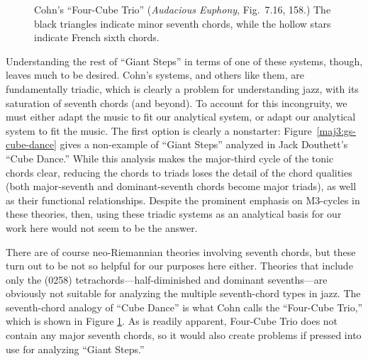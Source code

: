 \begin{figure}[p]
  \caption[``Giant Steps'' analyzed in Douthett's Cube Dance.]{``Giant
    Steps,'' mm.~1--5, analyzed in Douthett's Cube Dance. Begin by following the
    solid arrows, then continue with the dashed arrows.}
  \label{maj3:gs-cube-dance}

  \caption[Cohn's ``Four-Cube Trio'']{Cohn's ``Four-Cube Trio'' (\emph{Audacious
    Euphony}, Fig.~7.16, 158.) The black triangles indicate minor seventh chords,
    while the hollow stars indicate French sixth chords.}
  \label{maj3:four-cube-trio}
\end{figure}

Understanding the rest of ``Giant Steps'' in terms of one of these systems,
though, leaves much to be desired. Cohn's systems, and others like them, are
fundamentally triadic, which is clearly a problem for understanding jazz, with
its saturation of seventh chords (and beyond). To account for this
incongruity, we must either adapt the music to fit our analytical system, or
adapt our analytical system to fit the music. The first option is clearly a
nonstarter: Figure~\ref{maj3:gs-cube-dance} gives a non-example of ``Giant
Steps'' analyzed in Jack Douthett's ``Cube Dance.''
While this analysis makes the major-third cycle of the tonic chords clear,
reducing the chords to triads loses the detail of the chord qualities (both
major-seventh and dominant-seventh chords become major triads), as well as
their functional relationships. Despite the prominent emphasis on M3-cycles in
these theories, then, using these triadic systems as an analytical basis for
our work here would not seem to be the answer.

There are of course neo-Riemannian theories involving seventh chords, but
these turn out to be not so helpful for our purposes here either. Theories
that include only the (0258) tetrachords---half-diminished and dominant
sevenths---are obviously not suitable for analyzing the multiple seventh-chord
types in jazz. The seventh-chord analogy of ``Cube Dance'' is what Cohn calls
the ``Four-Cube Trio,'' which is shown in Figure
\ref{maj3:four-cube-trio}. As is readily apparent, Four-Cube Trio
does not contain any major seventh chords, so it would also create problems if
pressed into use for analyzing ``Giant Steps.''

